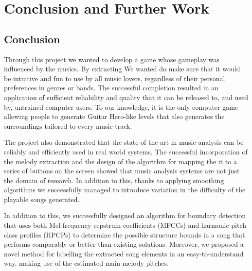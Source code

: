 
\chapter{Conclusion and Further Work} %

\label{Chapter7} %



\section{Conclusion}

Through this project we wanted to develop a game whose gameplay was influenced by the musics. By extracting We wanted do make sure that it would be intuitive and fun to use by all music lovers, regardless of their personal preferences in genres or bands. The successful completion resulted in an application of sufficient reliability and quality that it can be released to, and used by, untrained computer users. To our knowledge, it is the only computer game allowing people to generate Guitar Hero-like levels that also generates the surroundings tailored to every music track.

The project  also demonstrated that the state of the art in music analysis can be reliably and efficiently used in real world systems. The successful incorporation of the melody extraction and the design of the algorithm for mapping the it to a series of buttons on the screen showed that music analysis systems are not just the domain of research. In addition to this, thanks to applying smoothing algorithms we successfully managed to introduce variation in the difficulty of the playable songs generated.

In addition to this, we successfully designed an algorithm for boundary detection that uses both Mel-frequency cepstrum coefficients (MFCCs) and harmonic pitch class profiles (HPCPs) to determine the possible structure bounds in a song that performs comparably or better than existing solutions. Moreover, we proposed a novel method for labelling the extracted song elements in an easy-to-understand way, making use of the estimated main melody pitches. 

